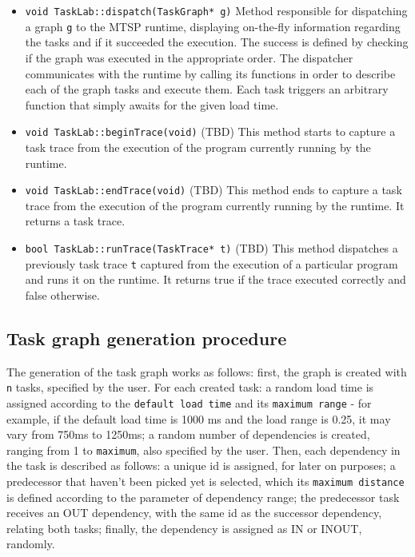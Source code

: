 \begin{itemize}
\item \texttt{void TaskLab::dispatch(TaskGraph* g)} \newline
Method responsible for dispatching a graph \texttt{g} to the MTSP runtime, displaying on-the-fly information regarding the tasks and if it succeeded the execution. The success is defined by checking if the graph was executed in the appropriate order.   The dispatcher   communicates with the runtime by calling its functions in order to describe each of the graph tasks and execute them. Each task triggers an arbitrary function that simply awaits for the given load time.

\item \texttt{void TaskLab::beginTrace(void)} (TBD) \newline
This method starts to capture a task trace from the execution of the program currently running by the runtime.

\item \texttt{void TaskLab::endTrace(void)} (TBD) \newline
This method ends to capture a task trace from the execution of the program currently running by the runtime. It returns a task trace.

\item \texttt{bool TaskLab::runTrace(TaskTrace* t)} (TBD) \newline
This method dispatches a previously task trace \texttt{t} captured from the execution of a particular program and runs it on the runtime. It returns true if the trace executed correctly and false otherwise.
\end{itemize}

\subsection{Task graph generation procedure}
The generation of the task graph works as follows: first, the graph is created with \texttt{n} tasks, specified by the user. For each created task: a random load time is assigned according to the \texttt{default load time} and its \texttt{maximum range} - for example, if the default load time is 1000 ms and the load range is 0.25, it may vary from 750ms to 1250ms; a random number of dependencies is created, ranging from 1 to \texttt{maximum}, also specified by the user.   Then, each dependency in the task is described as follows: a unique id is assigned, for later on purposes; a predecessor that haven't been picked yet is selected, which its \texttt{maximum distance} is defined according to the parameter of dependency range; the predecessor task receives an OUT dependency, with the same id as the successor dependency, relating both tasks; finally, the dependency is assigned as IN or INOUT, randomly. 

